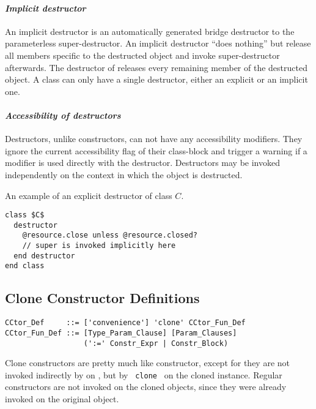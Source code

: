 \paragraph{\em Implicit destructor}
An implicit destructor is an automatically generated bridge destructor to the parameterless super-destructor. An implicit destructor ``does nothing'' but release all members specific to the destructed object and invoke super-destructor afterwards. The destructor of  releases every remaining member of the destructed object. A class can only have a single destructor, either an explicit or an implicit one. 

\paragraph{\em Accessibility of destructors}
Destructors, unlike constructors, can not have any accessibility modifiers. They ignore the current accessibility flag of their class-block and trigger a warning if a modifier is used directly with the destructor. Destructors may be invoked independently on the context in which the object is destructed. 

\example An example of an explicit destructor of class $C$. 
\begin{lstlisting}
class $C$
  destructor
    @resource.close unless @resource.closed?
    // super is invoked implicitly here
  end destructor
end class
\end{lstlisting}






\subsection{Clone Constructor Definitions}
\label{sec:clone-def}

\syntax\begin{lstlisting}
CCtor_Def     ::= ['convenience'] 'clone' CCtor_Fun_Def
CCtor_Fun_Def ::= [Type_Param_Clause] [Param_Clauses] 
                  (':=' Constr_Expr | Constr_Block)
\end{lstlisting}

Clone constructors are pretty much like constructor, except for they are not invoked indirectly by  on , but by ~\lstinline[deletekeywords={clone}]!clone!~ on the cloned instance. Regular constructors are not invoked on the cloned objects, since they were already invoked on the original object. 


